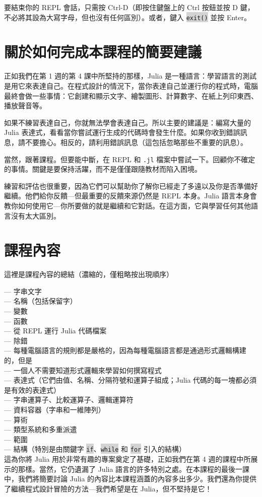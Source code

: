 \documentclass[]{article}
\newcommand{\codequote}[1]{\colorbox{lightgray}{\tt #1}}
\begin{document}
要結束你的 REPL 會話，只需按 Ctrl-D（即按住鍵盤上的 Ctrl 按鈕並按 D 鍵，不必將其設為大寫字母，但也沒有任何區別）。或者，鍵入 \codequote{exit()} 並按 Enter。

\section*{關於如何完成本課程的簡要建議}

正如我們在第 1 週的第 4 課中所堅持的那樣，Julia 是一種語言：學習語言的測試是用它來表達自己。在程式設計的情況下，當你表達自己並運行你的程式時，電腦最終會做一些事情：它創建和顯示文字、繪製圖形、計算數字、在紙上列印東西、播放聲音等。

如果不練習表達自己，你就無法學會表達自己。所以主要的建議是：編寫大量的 Julia 表達式，看看當你嘗試運行生成的代碼時會發生什麼。如果你收到錯誤訊息，請不要擔心。相反的，請利用錯誤訊息（這包括忽略那些不重要的訊息）。

當然，跟著課程。但要能中斷，在 REPL 和 {\tt .jl} 檔案中嘗試一下。回顧你不確定的事情。關鍵是要保持活躍，而不是僅僅跟隨教材而陷入困境。

練習和評估也很重要，因為它們可以幫助你了解你已經走了多遠以及你是否準備好繼續。他們給你反饋---但最重要的反饋來源仍然是 REPL 本身。Julia 語言本身會教你如何使用它---你所要做的就是繼續和它對話。在這方面，它與學習任何其他語言沒有太大區別。

\section*{課程內容}
這裡是課程內容的總結（濃縮的，僅粗略按出現順序）

--- 字串文字\\
--- 名稱（包括保留字）\\
--- 變數 \\
--- 函數 \\
--- 從 REPL 運行 Julia 代碼檔案 \\
--- 除錯 \\
--- 每種電腦語言的規則都是嚴格的，因為每種電腦語言都是通過形式邏輯構建的，但是 \\
--- 一個人不需要知道形式邏輯來學習如何撰寫程式 \\
--- 表達式（它們由值、名稱、分隔符號和運算子組成；Julia 代碼的每一塊都必須是有效的表達式）\\
--- 字串運算子、比較運算子、邏輯運算符 \\
--- 資料容器（字串和一維陣列）\\
--- 算術 \\
--- 類型系統和多重派遣 \\
--- 範圍 \\
--- 結構（特別是由關鍵字 \codequote{if}、\codequote{while} 和 \codequote{for} 引入的結構）\\

這為你將 Julia 用於非常有趣的專案奠定了基礎，正如我們在第 4 週的課程中所展示的那樣。當然，它仍遺漏了 Julia 語言的許多特別之處。在本課程的最後一課中，我們將簡要討論 Julia 的內容比本課程涵蓋的內容多出多少。我們還為你提供了繼續程式設計冒險的方法---我們希望是在 Julia，但不堅持是它！
\end{document}
